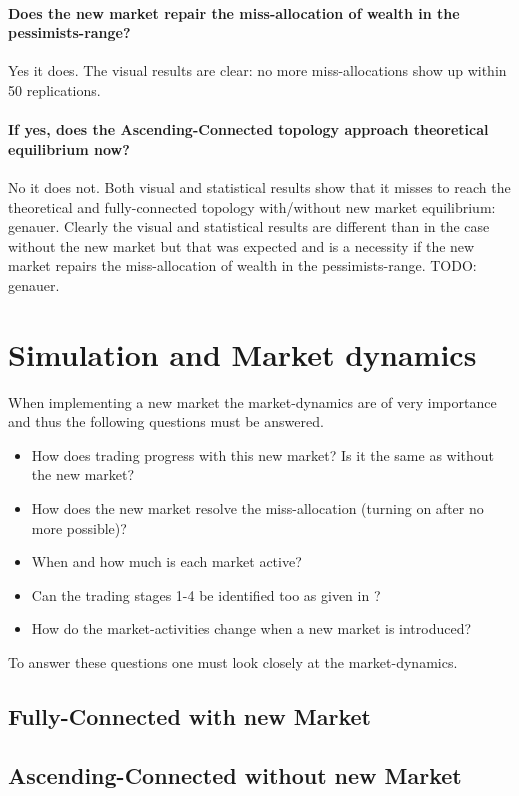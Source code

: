 \documentclass[Bachelorarbeit.tex]{subfiles}
\begin{document}
\paragraph{Does the new market repair the miss-allocation of wealth in the pessimists-range?}
Yes it does. The visual results are clear: no more miss-allocations show up within 50 replications.

\paragraph{If yes, does the Ascending-Connected topology approach theoretical equilibrium now?}
No it does not. Both visual and statistical results show that it misses to reach the theoretical and fully-connected topology with/without new market equilibrium: genauer.
Clearly the visual and statistical results are different than in the case without the new market but that was expected and is a necessity if the new market repairs the miss-allocation of wealth in the pessimists-range. TODO: genauer.


\section{Simulation and Market dynamics}
When implementing a new market the market-dynamics are of very importance and thus the following questions must be answered.

\begin{itemize}
\item How does trading progress with this new market? Is it the same as without the new market?
\item How does the new market resolve the miss-allocation (turning on after no more possible)?
\item When and how much is each market active? 
\item Can the trading stages 1-4 be identified too as given in \cite{Breuer_2015}?
\item How do the market-activities change when a new market is introduced?
\end{itemize}

To answer these questions one must look closely at the market-dynamics.

\subsection{Fully-Connected with new Market}

\subsection{Ascending-Connected without new Market}
\end{document}
